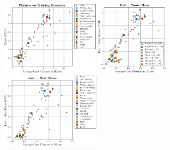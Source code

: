 \begin{figure}[t]
	\centering 
	\vspace*{-0.2cm}
	\begin{minipage}[t]{0.2\textwidth}
		\vspace*{0px}
				
		\includegraphics[height=3.6cm,clip,trim={0cm 0cm 3.75cm 0cm}]{plots_supp_flatness_correlation_seq_train_loss}
	\end{minipage}
	\hspace*{2px}
	\begin{minipage}[t]{0.2\textwidth}
		\vspace*{0px}
		
		\includegraphics[height=3.6cm]{plots_main_flatness_seq_test_train_arxiv}
	\end{minipage}
	\hspace*{2px}
	\begin{minipage}[t]{0.27\textwidth}
		\vspace*{-2.5px}
		
		\includegraphics[height=3.7cm]{plots_main_flatness_correlation_seq_last_best_loss}
	\end{minipage}
	\hspace*{2px}
	\begin{minipage}[t]{0.01\textwidth}
		\vspace*{0px}
		

\end{minipage}
\end{figure}
